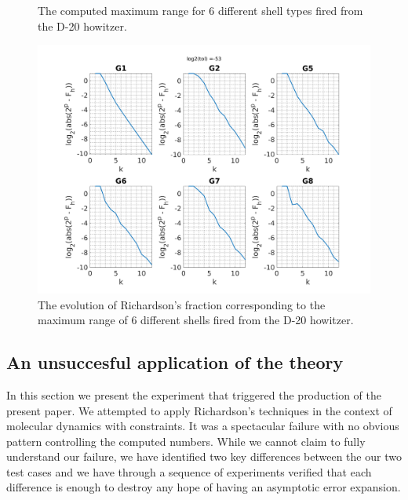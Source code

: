 \documentclass[runningheads]{llncs}
\begin{document}
\begin{figure}
  \centering
  \vgamma
  \caption{The computed maximum range for 6 different shell types fired from the D-20 howitzer.}
  \label{fig:maxrange_rk1_table_tol53} 
\end{figure}

\begin{figure}
  \centering
  \includegraphics[width=12cm]{maxrange_rk1_tol53.png}
  \caption{The evolution of Richardson's fraction corresponding to the maximum range of 6 different shells fired from the D-20 howitzer.} \label{fig:maxrange_rk1_fraction_tol53}
\end{figure}



\subsection{An unsuccesful application of the theory}

In this section we present the experiment that triggered the production of the present paper. We attempted to apply Richardson's techniques in the context of molecular dynamics with constraints. It was a spectacular failure with no obvious pattern controlling the computed numbers. While we cannot claim to fully understand our failure, we have identified two key differences between the our two test cases and we have through a sequence of experiments verified that each difference is enough to destroy any hope of having an asymptotic error expansion.
\end{document}

